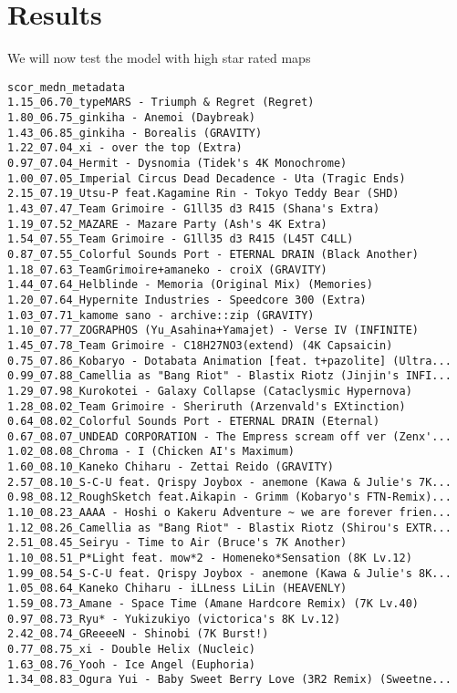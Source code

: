 

\section{Results}

We will now test the model with high star rated maps

\begin{lstlisting}
scor_medn_metadata
1.15_06.70_typeMARS - Triumph & Regret (Regret)
1.80_06.75_ginkiha - Anemoi (Daybreak)
1.43_06.85_ginkiha - Borealis (GRAVITY)
1.22_07.04_xi - over the top (Extra)
0.97_07.04_Hermit - Dysnomia (Tidek's 4K Monochrome)
1.00_07.05_Imperial Circus Dead Decadence - Uta (Tragic Ends)
2.15_07.19_Utsu-P feat.Kagamine Rin - Tokyo Teddy Bear (SHD)
1.43_07.47_Team Grimoire - G1ll35 d3 R415 (Shana's Extra)
1.19_07.52_MAZARE - Mazare Party (Ash's 4K Extra)
1.54_07.55_Team Grimoire - G1ll35 d3 R415 (L45T C4LL)
0.87_07.55_Colorful Sounds Port - ETERNAL DRAIN (Black Another)
1.18_07.63_TeamGrimoire+amaneko - croiX (GRAVITY)
1.44_07.64_Helblinde - Memoria (Original Mix) (Memories)
1.20_07.64_Hypernite Industries - Speedcore 300 (Extra)
1.03_07.71_kamome sano - archive::zip (GRAVITY)
1.10_07.77_ZOGRAPHOS (Yu_Asahina+Yamajet) - Verse IV (INFINITE)
1.45_07.78_Team Grimoire - C18H27NO3(extend) (4K Capsaicin)
0.75_07.86_Kobaryo - Dotabata Animation [feat. t+pazolite] (Ultra...
0.99_07.88_Camellia as "Bang Riot" - Blastix Riotz (Jinjin's INFI...
1.29_07.98_Kurokotei - Galaxy Collapse (Cataclysmic Hypernova)
1.28_08.02_Team Grimoire - Sheriruth (Arzenvald's EXtinction)
0.64_08.02_Colorful Sounds Port - ETERNAL DRAIN (Eternal)
0.67_08.07_UNDEAD CORPORATION - The Empress scream off ver (Zenx'...
1.02_08.08_Chroma - I (Chicken AI's Maximum)
1.60_08.10_Kaneko Chiharu - Zettai Reido (GRAVITY)
2.57_08.10_S-C-U feat. Qrispy Joybox - anemone (Kawa & Julie's 7K...
0.98_08.12_RoughSketch feat.Aikapin - Grimm (Kobaryo's FTN-Remix)...
1.10_08.23_AAAA - Hoshi o Kakeru Adventure ~ we are forever frien...
1.12_08.26_Camellia as "Bang Riot" - Blastix Riotz (Shirou's EXTR...
2.51_08.45_Seiryu - Time to Air (Bruce's 7K Another)
1.10_08.51_P*Light feat. mow*2 - Homeneko*Sensation (8K Lv.12)
1.99_08.54_S-C-U feat. Qrispy Joybox - anemone (Kawa & Julie's 8K...
1.05_08.64_Kaneko Chiharu - iLLness LiLin (HEAVENLY)
1.59_08.73_Amane - Space Time (Amane Hardcore Remix) (7K Lv.40)
0.97_08.73_Ryu* - Yukizukiyo (victorica's 8K Lv.12)
2.42_08.74_GReeeeN - Shinobi (7K Burst!)
0.77_08.75_xi - Double Helix (Nucleic)
1.63_08.76_Yooh - Ice Angel (Euphoria)
1.34_08.83_Ogura Yui - Baby Sweet Berry Love (3R2 Remix) (Sweetne...

\end{lstlisting}
